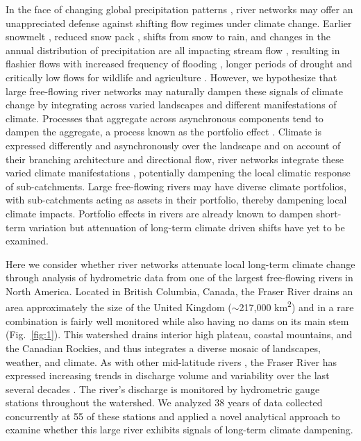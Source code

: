 \documentclass[9pt,twocolumn,twoside,lineno]{pnas-new}
\begin{document}
In the face of changing global precipitation patterns \cite{Donat:2016}, river networks may offer an unappreciated defense against shifting flow regimes under climate change\cite{Hartmann:2013,Palmer:2009}. Earlier snowmelt \cite{Rauscher:2008}, reduced snow pack \cite{McCabe:2014}, shifts from snow to rain, and changes in the annual distribution of precipitation are all impacting stream flow \cite{Hartmann:2013}, resulting in flashier flows with increased frequency of flooding \cite{Hirabayashi:2013}, longer periods of drought and critically low flows for wildlife and agriculture \cite{Melillo:2014}. However, we hypothesize that large free-flowing river networks may naturally dampen these signals of climate change by integrating across varied landscapes and different manifestations of climate. Processes that aggregate across asynchronous components tend to dampen the aggregate, a process known as the portfolio effect \cite{Doak:1998}. Climate is expressed differently and asynchronously over the landscape \cite{George:2015} and on account of their branching architecture and directional flow, river networks integrate these varied climate manifestations \cite{Peterson:2013}, potentially dampening the local climatic response of sub-catchments. Large free-flowing rivers may have diverse climate portfolios, with sub-catchments acting as assets in their portfolio, thereby dampening local climate impacts. Portfolio effects in rivers are already known to dampen short-term variation \cite{Moore:2015,Yeakel:2014} but attenuation of long-term climate driven shifts have yet to be examined.

Here we consider whether river networks attenuate local long-term climate change through analysis of hydrometric data from one of the largest free-flowing rivers in North America. Located in British Columbia, Canada, the Fraser River drains an area approximately the size of the United Kingdom ($\sim$217,000 km\textsuperscript{2}) and in a rare combination is fairly well monitored while also having no dams on its main stem \cite{Vorosmarty:2010} (Fig.~\ref{fig:1}). This watershed drains interior high plateau, coastal mountains, and the Canadian Rockies, and thus integrates a diverse mosaic of landscapes, weather, and climate. As with other mid-latitude rivers \cite{Bindoff:2013}, the Fraser River has expressed increasing trends in discharge volume and variability over the last several decades \cite{Dery:2012,Morrison:2002}. The river's discharge is monitored by hydrometric gauge stations throughout the watershed. We analyzed 38 years of data collected concurrently at 55 of these stations and applied a novel analytical approach to examine whether this large river exhibits signals of long-term climate dampening.
\end{document}
